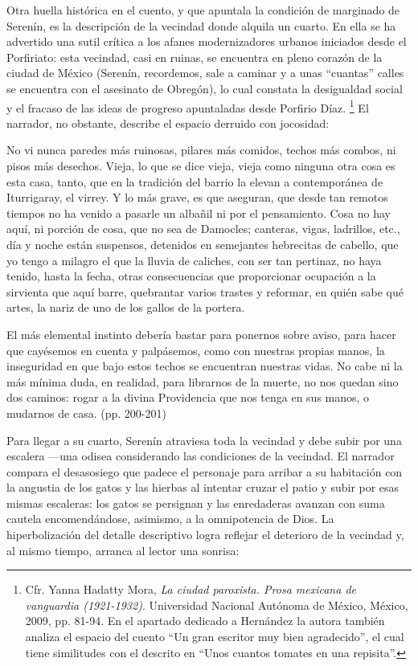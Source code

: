\documentclass[14pt,twoside,final]{extbook} %
\let\oldfootnote\footnote
\renewcommand\footnote[1]{%
\oldfootnote{\hspace{1mm}#1}}
\begin{document}
Otra huella histórica en el cuento, y que apuntala la condición de marginado de Serenín, es la descripción de la vecindad donde alquila un cuarto. En ella se ha advertido una sutil crítica a los afanes modernizadores urbanos iniciados desde el Porfiriato: esta vecindad, casi en ruinas, se encuentra en pleno corazón de la ciudad de México (Serenín, recordemos, sale a caminar y a unas ``cuantas'' calles se encuentra con el asesinato de Obregón), lo cual constata la desigualdad social y el fracaso de las ideas de progreso apuntaladas desde Porfirio Díaz.\footnote{Cfr. Yanna Hadatty Mora, \emph{La ciudad paroxista. Prosa mexicana de vanguardia (1921-1932)}. Universidad Nacional Autónoma de México, México, 2009, pp. 81-94. En el apartado dedicado a Hernández la autora también analiza el espacio del cuento ``Un gran escritor muy bien agradecido'', el cual tiene similitudes con el descrito en ``Unos cuantos tomates en una repisita''.} El narrador, no obstante, describe el espacio derruido con jocosidad:
\begin{quoting}
No vi nunca paredes más ruinosas, pilares más comidos, techos más combos, ni pisos más desechos. Vieja, lo que se dice vieja, vieja como ninguna otra cosa es esta casa, tanto, que en la tradición del barrio la elevan a contemporánea de Iturrigaray, el virrey. Y lo más grave, es que aseguran, que desde tan remotos tiempos no ha venido a pasarle un albañil ni por el pensamiento. Cosa no hay aquí, ni porción de cosa, que no sea de Damocles; canteras, vigas, ladrillos, etc., día y noche están suspensos, detenidos en semejantes hebrecitas de cabello, que yo tengo a milagro el que la lluvia de caliches, con ser tan pertinaz, no haya tenido, hasta la fecha, otras consecuencias que proporcionar ocupación a la sirvienta que aquí barre, quebrantar varios trastes y reformar, en quién sabe qué artes, la nariz de uno de los gallos de la portera.

El más elemental instinto debería bastar para ponernos sobre aviso, para hacer que cayésemos en cuenta y palpásemos, como con nuestras propias manos, la inseguridad en que bajo estos techos se encuentran nuestras vidas. No cabe ni la más mínima duda, en realidad, para librarnos de la muerte, no nos quedan sino dos caminos: rogar a la divina Providencia que nos tenga en sus manos, o mudarnos de casa. (pp. 200-201)
\end{quoting}
Para llegar a su cuarto, Serenín atraviesa toda la vecindad y debe subir por una escalera ---una odisea considerando las condiciones de la vecindad. El narrador compara el desasosiego que padece el personaje para arribar a su habitación con la angustia de los gatos y las hierbas al intentar cruzar el patio y subir por esas mismas escaleras: los gatos se persignan y las enredaderas avanzan con suma cautela encomendándose, asimismo, a la omnipotencia de Dios. La hiperbolización del detalle descriptivo logra reflejar el deterioro de la vecindad y, al mismo tiempo, arranca al lector una sonrisa:
\end{document}
